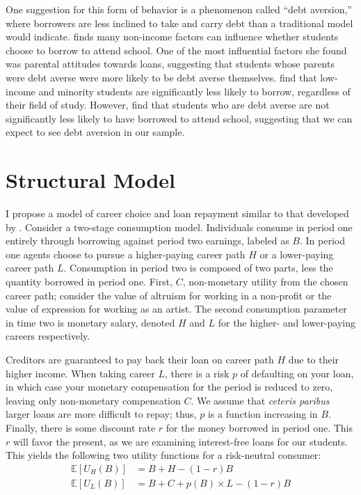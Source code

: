 \documentclass{article}
\begin{document}
	One suggestion for this form of behavior is a phenomenon called ``debt aversion,'' where borrowers are less inclined to take and carry debt than a traditional model would indicate. \textcite{burdman2005} finds many non-income factors can influence whether students choose to borrow to attend school. One of the most influential factors she found was parental attitudes towards loans, suggesting that students whose parents were debt averse were more likely to be debt averse themselves. \textcite{callender2005} find that low-income and minority students are significantly less likely to borrow, regardless of their field of study. However, \textcite{eckel2007} find that students who are debt averse are not significantly less likely to have borrowed to attend school, suggesting that we can expect to see debt aversion in our sample. 

	\section{Structural Model}

	I propose a model of career choice and loan repayment similar to that developed by \textcite{abraham2018}. Consider a two-stage consumption model. Individuals consume in period one entirely through borrowing against period two earnings, labeled as $B$. In period one agents choose to pursue a higher-paying career path $H$ or a lower-paying career path $L$. Consumption in period two is composed of two parts, less the quantity borrowed in period one. First, $C$, non-monetary utility from the chosen career path; consider the value of altruism for working in a non-profit or the value of expression for working as an artist. The second consumption parameter in time two is monetary salary, denoted $H$ and $L$ for the higher- and lower-paying careers respectively.
	
	Creditors are guaranteed to pay back their loan on career path $H$ due to their higher income. When taking career $L$, there is a risk $p$ of defaulting on your loan, in which case your monetary compensation for the period is reduced to zero, leaving only non-monetary compensation $C$. We assume that \emph{ceteris paribus} larger loans are more difficult to repay; thus, $p$ is a function increasing in $B$. Finally, there is some discount rate $r$ for the money borrowed in period one. This $r$ will favor the present, as we are examining interest-free loans for our students. This yields the following two utility functions for a risk-neutral consumer: 
	\begin{align}
	\mathbb{E}\left[U_H(B)\right] &= B + H - (1 - r)B \label{highu}\\
	\mathbb{E}\left[U_L(B)\right] &= B + C + p(B) \times L - (1 - r)B \label{lowu}
	\end{align}
	
\end{document}
